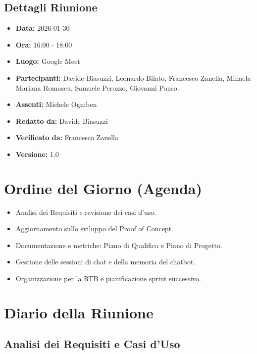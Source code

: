 \documentclass[a4paper, 11pt, oneside]{scrartcl}
\begin{document}
\subsection{Dettagli Riunione}
\begin{itemize}
    \item \textbf{Data:} 2026-01-30
    \item \textbf{Ora:} 16:00 - 18:00
    \item \textbf{Luogo:} Google Meet
    \item \textbf{Partecipanti:} Davide Biasuzzi, Leonardo Bilato, Francesco Zanella, Mihaela-Mariana Romascu, Samuele Perozzo, Giovanni Ponso.
    \item \textbf{Assenti:} Michele Ogniben
    \item \textbf{Redatto da:} Davide Biasuzzi
    \item \textbf{Verificato da:} Francesco Zanella
    \item \textbf{Versione:} 1.0
\end{itemize}


\newpage
\section{Ordine del Giorno (Agenda)}
\begin{itemize}
    \item[1.] Analisi dei Requisiti e revisione dei casi d'uso.
    \item[2.] Aggiornamento sullo sviluppo del Proof of Concept.
    \item[3.] Documentazione e metriche: Piano di Qualifica e Piano di Progetto.
    \item[4.] Gestione delle sessioni di chat e della memoria del chatbot.
    \item[5.] Organizzazione per la RTB e pianificazione sprint successivo.
\end{itemize}

\newpage
\section{Diario della Riunione}

\subsection{Analisi dei Requisiti e Casi d'Uso}
\end{document}
